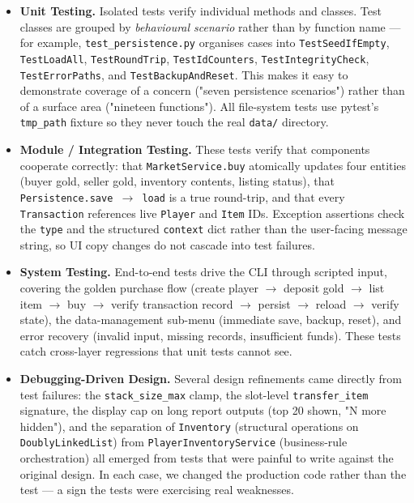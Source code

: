 \documentclass[11pt,a4paper]{article}
\begin{document}
\begin{itemize}
    \item \textbf{Unit Testing.}
    Isolated tests verify individual methods and classes. Test classes are grouped by \emph{behavioural scenario} rather than by function name — for example, \texttt{test\_persistence.py} organises cases into \texttt{TestSeedIfEmpty}, \texttt{TestLoadAll}, \texttt{TestRoundTrip}, \texttt{TestIdCounters}, \texttt{TestIntegrityCheck}, \texttt{TestErrorPaths}, and \texttt{TestBackupAndReset}. This makes it easy to demonstrate coverage of a concern ("seven persistence scenarios") rather than of a surface area ("nineteen functions"). All file-system tests use pytest's \texttt{tmp\_path} fixture so they never touch the real \texttt{data/} directory.

    \item \textbf{Module / Integration Testing.}
    These tests verify that components cooperate correctly: that \texttt{MarketService.buy} atomically updates four entities (buyer gold, seller gold, inventory contents, listing status), that \texttt{Persistence.save \(\rightarrow\) load} is a true round-trip, and that every \texttt{Transaction} references live \texttt{Player} and \texttt{Item} IDs. Exception assertions check the \texttt{type} and the structured \texttt{context} dict rather than the user-facing message string, so UI copy changes do not cascade into test failures.

    \item \textbf{System Testing.}
    End-to-end tests drive the CLI through scripted input, covering the golden purchase flow (create player \(\rightarrow\) deposit gold \(\rightarrow\) list item \(\rightarrow\) buy \(\rightarrow\) verify transaction record \(\rightarrow\) persist \(\rightarrow\) reload \(\rightarrow\) verify state), the data-management sub-menu (immediate save, backup, reset), and error recovery (invalid input, missing records, insufficient funds). These tests catch cross-layer regressions that unit tests cannot see.

    \item \textbf{Debugging-Driven Design.}
    Several design refinements came directly from test failures: the \texttt{stack\_size\_max} clamp, the slot-level \texttt{transfer\_item} signature, the display cap on long report outputs (top 20 shown, "N more hidden"), and the separation of \texttt{Inventory} (structural operations on \texttt{DoublyLinkedList}) from \texttt{PlayerInventoryService} (business-rule orchestration) all emerged from tests that were painful to write against the original design. In each case, we changed the production code rather than the test — a sign the tests were exercising real weaknesses.

\end{itemize}
\end{document}
